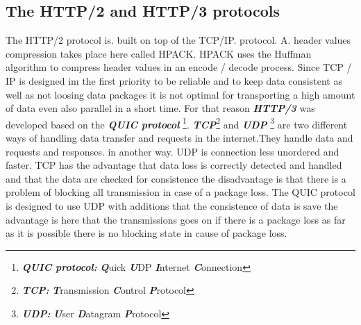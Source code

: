 \documentclass[10pt,a4paper,english]{article}
\newcommand{\abbrhighcol}[1]{\textbf{\textit{#1}}}
\begin{document}
\begin{multicols}{2}
\subsection{The HTTP/2 and HTTP/3 protocols}
\begin{flushleft}
The HTTP/2 protocol is. built on top of the TCP/IP. protocol. A. header values compression takes place here called HPACK. HPACK uses the Huffman algorithm to compress header values in an encode / decode process. Since TCP / IP is designed im the first priority to be reliable and to keep data consistent as well as not loosing data packages it is not optimal for transporting a high amount of data even also parallel in a short time. For that reason \abbrhighcol{HTTP/3} was developed based on the \abbrhighcol {QUIC protocol} \footnote{\abbrhighcol {QUIC protocol:} \abbrhighcol{Q}uick \abbrhighcol {U}DP \abbrhighcol{I}nternet \abbrhighcol{C}onnection}.
\abbrhighcol {TCP}\footnote{\abbrhighcol {TCP:} \abbrhighcol {T}ransmission \abbrhighcol {C}ontrol \abbrhighcol {P}rotocol} and \abbrhighcol {UDP} \footnote{\abbrhighcol{UDP: }\abbrhighcol{U}ser \abbrhighcol{D}atagram \abbrhighcol{P}rotocol} are two different ways of handling data transfer and requests in the internet.They handle data and requests and responses. in another way. UDP is connection less unordered and faster. TCP has the advantage that data loss is correctly detected and handled and that the data are checked for consistence the disadvantage is that there is a problem of blocking all transmission in case of a package loss. The QUIC protocol is designed to use UDP with additions  that the consistence of data is save  the advantage is here that the transmissions goes on if there is a package loss as far as it is possible there is no blocking state in cause of package loss.  
\end{flushleft}
\end{multicols}
\end{document}
